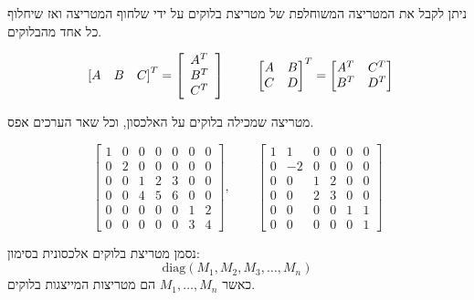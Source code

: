 \documentclass{tstextbook}
\begin{document}
\begin{proposition}
ניתן לקבל את המטריצה המשוחלפת של מטריצת בלוקים על ידי שלחוף המטריצה ואז שיחלוף כל אחד מהבלוקים.

\end{proposition}
\begin{example}
$$\begin{array}{l l l}{{\left[A\quad B\quad C\right]^{T}=\left[\begin{array}{l}{{A^{T}}}\\ {{B^{T}}}\\ {{C^{T}}}\end{array}\right]}}\end{array}\qquad \begin{bmatrix}A & B \\C & D \end{bmatrix}^{T}=\begin{bmatrix}A^{T} & C^{T} \\B^{T} & D^{T}
\end{bmatrix}$$

\end{example}
\begin{definition}
מטריצה שמכילה בלוקים על האלכסון, וכל שאר הערכים אפס.

\end{definition}
\begin{example}
$$\left[\begin{matrix}1 & 0 & 0 & 0 & 0 & 0 & 0\\0 & 2 & 0 & 0 & 0 & 0 & 0\\0 & 0 & 1 & 2 & 3 & 0 & 0\\0 & 0 & 4 & 5 & 6 & 0 & 0\\0 & 0 & 0 & 0 & 0 & 1 & 2\\0 & 0 & 0 & 0 & 0 & 3 & 4\end{matrix}\right],\quad \quad  \left[\begin{matrix}1 & 1 & 0 & 0 & 0 & 0\\0 & -2 & 0 & 0 & 0 & 0\\0 & 0 & 1 & 2 & 0 & 0\\0 & 0 & 2 & 3 & 0 & 0\\0 & 0 & 0 & 0 & 1 & 1\\0 & 0 & 0 & 0 & 0 & 1\end{matrix}\right]$$

\end{example}
\begin{symbolize}
נסמן מטריצת בלוקים אלכסונית בסימון:
$$\mathrm{diag}\left( M_{1},M_{2},M_{3},\dots ,M_{n}\right)$$
כאשר \(M_{1},\dots,M_{n}\) הם מטריצות המייצגות בלוקים.

\end{symbolize}
\end{document}

